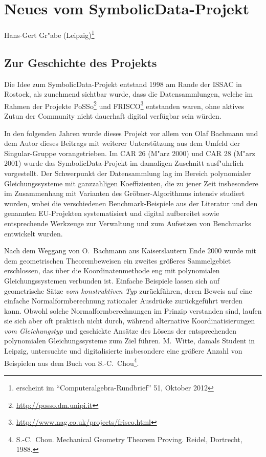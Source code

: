 \documentclass{article}
\newcommand{\SD}{{\sc Symbolic\-Data}}
\begin{document}
\section*{\centering Neues vom \SD-Projekt}

\begin{center} 
Hans-Gert Gr"abe (Leipzig)\footnote{erscheint im ``Computeralgebra-Rundbrief''
  51, Oktober 2012}
\end{center}

\subsection*{Zur Geschichte des Projekts}

Die Idee zum \SD-Projekt entstand 1998 am Rande der ISSAC in Rostock, als
zunehmend sichtbar wurde, dass die Datensammlungen, welche im Rahmen der
Projekte PoSSo\footnote{\url{http://posso.dm.unipi.it}} und
FRISCO\footnote{\url{http://www.nag.co.uk/projects/frisco.html}} entstanden
waren, ohne aktives Zutun der Community nicht dauerhaft digital verfügbar sein
würden.

In den folgenden Jahren wurde dieses Projekt vor allem von Olaf Bachmann und
dem Autor dieses Beitrags mit weiterer Unterstützung aus dem Umfeld der
Singular-Gruppe vorangetrieben. Im CAR 26 (M"arz 2000) und CAR 28 (M"arz 2001)
wurde das \SD-Projekt im damaligen Zuschnitt ausf"uhrlich vorgestellt.  Der
Schwerpunkt der Datensammlung lag im Bereich polynomialer Gleichungssysteme
mit ganzzahligen Koeffizienten, die zu jener Zeit insbesondere im Zusammenhang
mit Varianten des Gröbner-Algorithmus intensiv studiert wurden, wobei die
verschiedenen Benchmark-Beispiele aus der Literatur und den genannten
EU-Projekten systematisiert und digital aufbereitet sowie entsprechende
Werkzeuge zur Verwaltung und zum Aufsetzen von Benchmarks entwickelt wurden.
 
Nach dem Weggang von O.~Bachmann aus Kaiserslautern Ende 2000 wurde mit dem
geometrischen Theorembeweisen ein zweites größeres Sammelgebiet erschlossen,
das über die Koordinatenmethode eng mit polynomialen Gleichungssystemen
verbunden ist. Einfache Beispiele lassen sich auf geometrische Sätze \emph{vom
  konstruktiven Typ} zurückführen, deren Beweis auf eine
{\glqq}einfache{\grqq} Normalformberechnung rationaler Ausdrücke zurückgeführt
werden kann. Obwohl solche Normalformberechnungen im Prinzip verstanden sind,
laufen sie sich aber oft praktisch nicht durch, während alternative
Koordinatisierungen \emph{vom Gleichungstyp} und geschickte Ansätze des Lösens
der entsprechenden polynomialen Gleichungssysteme zum Ziel führen. M.~Witte,
damals Student in Leipzig, untersuchte und digitalisierte insbesondere eine
größere Anzahl von Beispielen aus dem Buch von S.-C.~Chou\footnote{S.-C.~Chou.
  Mechanical Geometry Theorem Proving. Reidel, Dortrecht, 1988.}.
\end{document}
